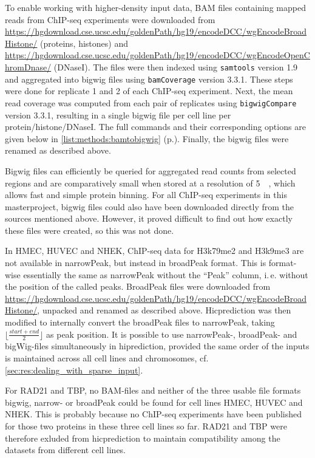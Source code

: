 To enable working with higher-density input data, BAM files containing mapped reads from ChIP-seq experiments were downloaded from 
\url{https://hgdownload.cse.ucsc.edu/goldenPath/hg19/encodeDCC/wgEncodeBroadHistone/} (proteins, histones) and 
\url{https://hgdownload.cse.ucsc.edu/goldenPath/hg19/encodeDCC/wgEncodeOpenChromDnase/} (DNaseI). 
The files were then indexed using \texttt{samtools} version 1.9
and aggregated into bigwig files using \texttt{bamCoverage} version 3.3.1. 
These steps were done for replicate 1 and 2 of each ChIP-seq experiment.
Next, the mean read coverage was computed from each pair of replicates using \texttt{bigwigCompare} version 3.3.1, 
resulting in a single bigwig file per cell line per protein/histone/DNaseI.
The full commands and their corresponding options are given below in \autoref{list:methods:bamtobigwig} (p.\;\pageref{list:methods:bamtobigwig}).
Finally, the bigwig files were renamed as described above.

Bigwig files can efficiently be queried for aggregated read counts from selected regions
and are comparatively small when stored at a resolution of \SI{5}{\kilo\bp}, which allows fast and simple protein binning.
For all ChIP-seq experiments in this masterproject, bigwig files could also have been downloaded directly from the sources mentioned above.
However, it proved difficult to find out how exactly these files were created, so this was not done.

In HMEC, HUVEC and NHEK, ChIP-seq data for H3k79me2 and H3k9me3 are not available in narrowPeak,
but instead in broadPeak format. This is format-wise essentially the same as narrowPeak
without the ``Peak'' column, i.\,e. without the position of the called peaks. 
BroadPeak files were downloaded from 
\url{https://hgdownload.cse.ucsc.edu/goldenPath/hg19/encodeDCC/wgEncodeBroadHistone/}, 
unpacked and renamed as described above. 
Hicprediction was then modified to internally convert the broadPeak files to 
narrowPeak, taking $\lfloor\frac{start + end}{2}\rfloor$ as peak position. 
It is possible to use narrowPeak-, broadPeak- and bigWig-files simultaneously in hiprediction, 
provided the same order of the inputs is maintained across all cell lines and chromosomes, cf.\;\autoref{sec:res:dealing_with_sparse_input}.

For RAD21 and TBP, no BAM-files and neither of the three usable file formats bigwig, narrow- or broadPeak 
could be found for cell lines HMEC, HUVEC and NHEK.
This is probably because no ChIP-seq experiments have been published for those two proteins in these three cell lines so far.
RAD21 and TBP were therefore exluded from hicprediction to maintain compatibility among the datasets from different cell lines.

